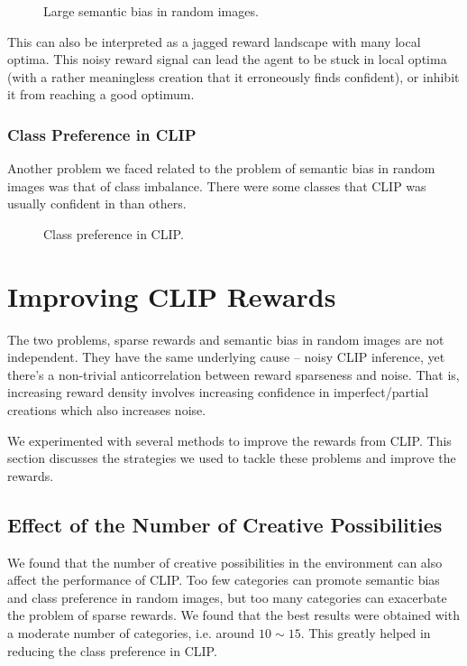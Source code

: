 \begin{figure}[h]
    \centering
    \caption{Large semantic bias in random images.}
    \label{fig:semantic-bias-random}
\end{figure}

This can also be interpreted as a jagged reward landscape with many local optima.
This noisy reward signal can lead the agent to be stuck in local optima (with a rather meaningless creation that it erroneously finds confident), or inhibit it from reaching a good optimum.

\subsubsection{Class Preference in CLIP}
Another problem we faced related to the problem of semantic bias in random images was that of class imbalance.
There were some classes that CLIP was usually confident in than others.

\begin{figure}[h]
    \centering
    \caption{Class preference in CLIP.}
    \label{fig:class-preference}
\end{figure}

\section{Improving CLIP Rewards}
\label{sec:improving-rewards}

The two problems, sparse rewards and semantic bias in random images are not independent. They have the same underlying cause -- noisy CLIP inference, yet there's a non-trivial anticorrelation between reward sparseness and noise.
That is, increasing reward density involves increasing confidence in imperfect/partial creations which also increases noise.

We experimented with several methods to improve the rewards from CLIP.
This section discusses the strategies we used to tackle these problems and improve the rewards.

\subsection{Effect of the Number of Creative Possibilities}
\label{sec:clip-categories}
We found that the number of creative possibilities in the environment can also affect the performance of CLIP.
Too few categories can promote semantic bias and class preference in random images, but too many categories can exacerbate the problem of sparse rewards.
We found that the best results were obtained with a moderate number of categories, i.e. around \(10 \sim 15\).
This greatly helped in reducing the class preference in CLIP.

